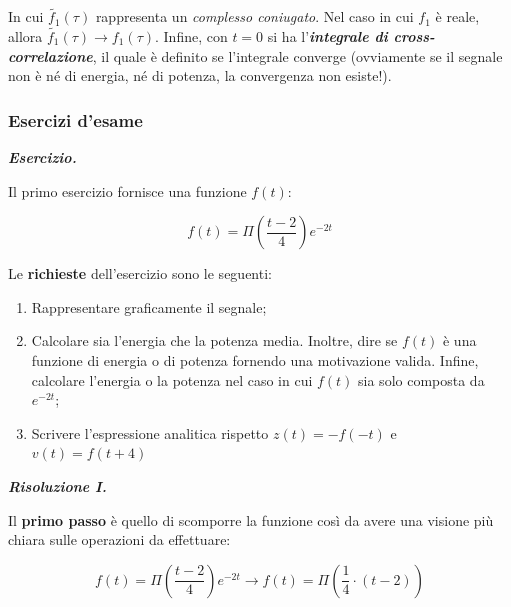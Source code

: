 \documentclass[a4paper]{article}
\begin{document}
	\noindent
	In cui $\tilde{f_1}(\tau)$ rappresenta un \emph{complesso coniugato}. Nel caso in cui $f_1$ è reale, allora $\tilde{f_1}(\tau) \rightarrow f_1(\tau)$. \newline
	Infine, con $t = 0$ si ha l'\textbf{\emph{integrale di cross-correlazione}}, il quale è definito se l'integrale converge (ovviamente se il segnale non è né di energia, né di potenza, la convergenza non esiste!).
	
	\newpage
	
	
	
	
	\subsubsection{Esercizi d'esame}
	
	\textcolor{Red3}{\textbf{\emph{Esercizio.}}}
	
	Il primo esercizio fornisce una funzione $f(t)$:
	
	\begin{equation*}
		f(t) = \Pi \left(\dfrac{t-2}{4}\right) e^{-2t}
	\end{equation*}

	\noindent
	Le \textbf{richieste} dell'esercizio sono le seguenti:
	
	\begin{enumerate}[label=\Roman*]
		\item Rappresentare graficamente il segnale;
		
		\item Calcolare sia l'energia che la potenza media. Inoltre, dire se $f(t)$ è una funzione di energia o di potenza fornendo una motivazione valida. Infine, calcolare l'energia o la potenza nel caso in cui $f(t)$ sia solo composta da $e^{-2t}$;
		
		\item Scrivere l'espressione analitica rispetto $z(t) = -f(-t)$ e $v(t) = f(t+4)$
	\end{enumerate}

	\noindent
	\textcolor{Green4}{\textbf{\emph{Risoluzione I.}}}
	
	\noindent
	Il \textbf{primo passo} è quello di scomporre la funzione così da avere una visione più chiara sulle operazioni da effettuare:
	
	\begin{equation*}
		f(t) = \Pi \left(\dfrac{t-2}{4}\right) e^{-2t} \longrightarrow f(t) = \Pi \left(\dfrac{1}{4} \cdot \left(t - 2\right)\right)
	\end{equation*}
\end{document}
